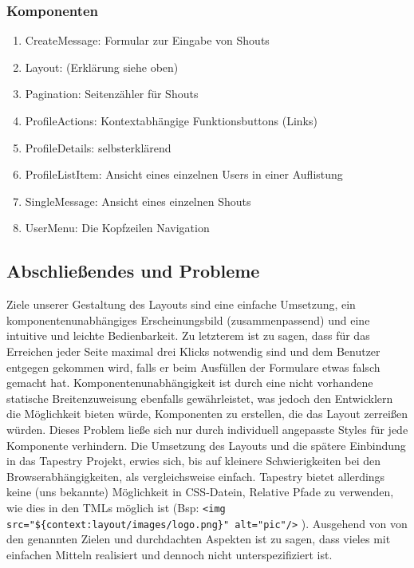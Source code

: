 \subsubsection*{Komponenten}
\begin{enumerate}
\item CreateMessage: Formular zur Eingabe von Shouts
\item Layout: (Erklärung siehe oben)
\item Pagination: Seitenzähler für Shouts
\item ProfileActions: Kontextabhängige Funktionsbuttons (Links)
\item ProfileDetails: selbsterklärend
\item ProfileListItem: Ansicht eines einzelnen Users in einer Auflistung
\item SingleMessage: Ansicht eines einzelnen Shouts
\item UserMenu: Die Kopfzeilen Navigation
\end{enumerate}

\subsection*{Abschließendes und Probleme}
Ziele unserer Gestaltung des Layouts sind eine einfache Umsetzung, ein komponentenunabhängiges Erscheinungsbild (zusammenpassend) und eine intuitive und leichte Bedienbarkeit. Zu letzterem ist zu sagen, dass für das Erreichen jeder Seite maximal drei Klicks notwendig sind und dem Benutzer entgegen gekommen wird, falls er beim Ausfüllen der Formulare etwas falsch gemacht hat. Komponentenunabhängigkeit ist durch eine nicht vorhandene statische Breitenzuweisung ebenfalls gewährleistet, was jedoch den Entwicklern die Möglichkeit bieten würde, Komponenten zu erstellen, die das Layout zerreißen würden. Dieses Problem ließe sich nur durch individuell angepasste Styles für jede Komponente verhindern. Die Umsetzung des Layouts und die spätere Einbindung in das Tapestry Projekt, erwies sich, bis auf kleinere Schwierigkeiten bei den Browserabhängigkeiten, als vergleichsweise einfach. Tapestry bietet allerdings keine (uns bekannte) Möglichkeit in CSS-Datein, Relative Pfade zu verwenden, wie dies in den TMLs möglich ist (Bsp:  \verb+<img src="${context:layout/images/logo.png}" alt="pic"/>+ ). Ausgehend von von den genannten Zielen und durchdachten Aspekten ist zu sagen, dass vieles mit einfachen Mitteln realisiert und dennoch nicht unterspezifiziert ist. 

